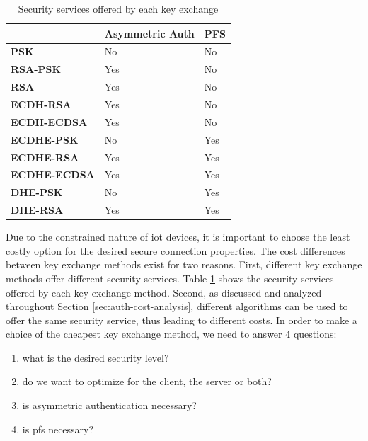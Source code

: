 \documentclass{llncs}
\begin{document}
\begin{table}[]
\begin{tabular}{|l|l|l|}
\hline
                     & \textbf{Asymmetric Auth} & \textbf{PFS} \\ \hline
\textbf{PSK}         & No                       & No           \\ \hline
\textbf{RSA-PSK}     & Yes                      & No           \\ \hline
\textbf{RSA}         & Yes                      & No           \\ \hline
\textbf{ECDH-RSA}    & Yes                      & No           \\ \hline
\textbf{ECDH-ECDSA}  & Yes                      & No           \\ \hline
\textbf{ECDHE-PSK}   & No                       & Yes          \\ \hline
\textbf{ECDHE-RSA}   & Yes                      & Yes          \\ \hline
\textbf{ECDHE-ECDSA} & Yes                      & Yes          \\ \hline
\textbf{DHE-PSK}     & No                       & Yes          \\ \hline
\textbf{DHE-RSA}     & Yes                      & Yes          \\ \hline
\end{tabular}
\centering \caption{\label{table:key-exch-sec-ser} Security services offered by each key exchange}
\end{table}


Due to the constrained nature of \gls{iot} devices, it is important to choose the least costly option for the desired secure
connection properties.
The cost differences between key exchange methods exist for two reasons. First, different key exchange methods offer different
security services. Table \ref{table:key-exch-sec-ser} shows the security services offered by each key exchange method. Second, as
discussed and analyzed throughout Section \ref{sec:auth-cost-analysis}, different algorithms can be used to offer the same
security service, thus leading to different costs. In order to make a choice of the cheapest key
exchange method, we need to answer $4$ questions:

\begin{enumerate}
  \item what is the desired security level?
  \item do we want to optimize for the client, the server or both?
  \item is asymmetric authentication necessary?
  \item is \gls{pfs} necessary?
\end{enumerate}
\end{document}
